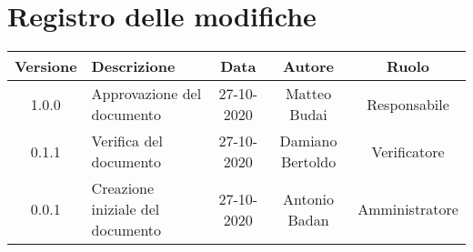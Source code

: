 \section*{Registro delle modifiche}

\begin{center}
	\begin{longtable}{|c|p{5cm}|c|c|c|}
	\hline
	\rowcolor{lighter-grayer}
	\textbf{Versione} & \textbf{Descrizione} & \textbf{Data} & \textbf{Autore} & \textbf{Ruolo} \\
	\hline
	\endfirsthead


	\hline
	1.0.0 & Approvazione del documento & 27-10-2020 & Matteo Budai & Responsabile \\
	\hline
    0.1.1 & Verifica del documento & 27-10-2020 & Damiano Bertoldo & Verificatore \\
    \hline
    0.0.1 & Creazione iniziale del documento & 27-10-2020 & Antonio Badan & Amministratore \\
    \hline
	\end{longtable}
\end{center}